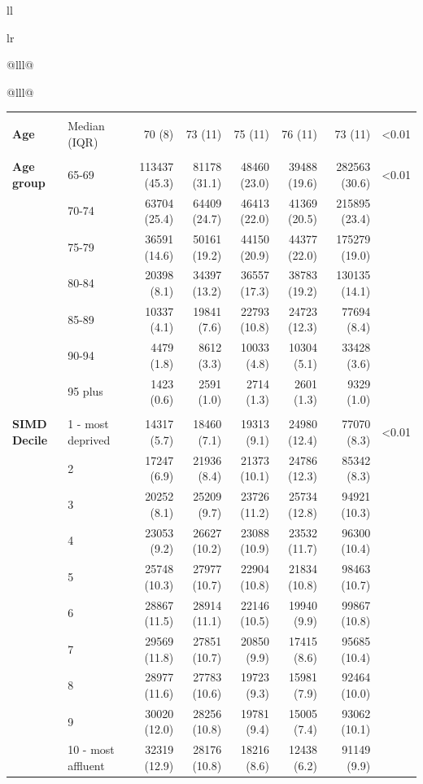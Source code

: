 \documentclass[12pt,a4paper,oneside,table]{report}
\begin{document}
\begin{tabular}[t]{ll}
\begin{tabular}{lr}
{\begin{tabular}{@{}lll@{}}
\begin{tabular}{@{}lll@{}}
\begin{table}[]
{\begin{threeparttable}
\begin{tabular}{@{}llrrrrrr@{}}
{} & & & & & & & \\
\textbf{Age} & Median (IQR) & 70 (8) & 73 (11) & 75 (11) & 76 (11) & 73 (11) & \textless 0.01\\
{} & & & & & & & \\
\textbf{Age group} & 65-69 & 113437 (45.3) & 81178 (31.1) & 48460 (23.0) & 39488 (19.6) & 282563 (30.6) & \textless 0.01 \\
\textbf{} & 70-74 & 63704 (25.4) & 64409 (24.7) & 46413 (22.0) & 41369 (20.5) & 215895 (23.4) & \\
\textbf{} & 75-79 & 36591 (14.6) & 50161 (19.2) & 44150 (20.9) & 44377 (22.0) & 175279 (19.0) & \\
\textbf{} & 80-84 & 20398 (8.1) & 34397 (13.2) & 36557 (17.3) & 38783 (19.2) & 130135 (14.1) & \\
\textbf{} & 85-89 & 10337 (4.1) & 19841 (7.6) & 22793 (10.8) & 24723 (12.3) & 77694 (8.4) & \\
\textbf{} & 90-94 & 4479 (1.8) & 8612 (3.3) & 10033 (4.8) & 10304 (5.1) & 33428 (3.6) & \\
\textbf{} & 95 plus & 1423 (0.6) & 2591 (1.0) & 2714 (1.3) & 2601 (1.3) & 9329 (1.0) & \\
{} & & & & & & & \\
\textbf{SIMD Decile} & 1 - most deprived & 14317 (5.7) & 18460 (7.1) & 19313 (9.1) & 24980 (12.4) & 77070 (8.3) & \textless 0.01 \\
\textbf{} & 2 & 17247 (6.9) & 21936 (8.4) & 21373 (10.1) & 24786 (12.3) & 85342 (8.3) & \\
\textbf{} & 3 & 20252 (8.1) & 25209 (9.7) & 23726 (11.2) & 25734 (12.8) & 94921 (10.3) & \\
\textbf{} & 4 & 23053 (9.2) & 26627 (10.2) & 23088 (10.9) & 23532 (11.7) & 96300 (10.4) & \\
\textbf{} & 5 & 25748 (10.3) & 27977 (10.7) & 22904 (10.8) & 21834 (10.8) & 98463 (10.7) & \\
\textbf{} & 6 & 28867 (11.5) & 28914 (11.1) & 22146 (10.5) & 19940 (9.9) & 99867 (10.8) & \\
\textbf{} & 7 & 29569 (11.8) & 27851 (10.7) & 20850 (9.9) & 17415 (8.6) & 95685 (10.4) & \\
\textbf{} & 8 & 28977 (11.6) & 27783 (10.6) & 19723 (9.3) & 15981 (7.9) & 92464 (10.0) & \\
\textbf{} & 9 & 30020 (12.0) & 28256 (10.8) & 19781 (9.4) & 15005 (7.4) & 93062 (10.1) & \\
\textbf{} & 10 - most affluent & 32319 (12.9) & 28176 (10.8) & 18216 (8.6) & 12438 (6.2) & 91149 (9.9) & \\

\end{tabular}
\end{threeparttable}}
\end{table}
\end{tabular}
\end{tabular}}
\end{tabular}
\end{tabular}
\end{document}
